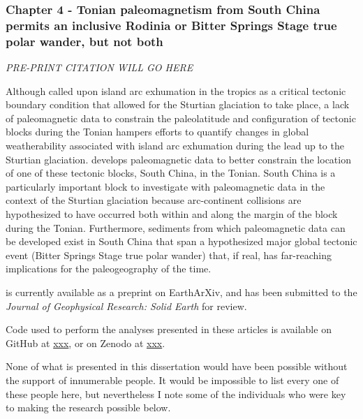 \documentclass{ucbthesis}
\begin{document}
\begin{frontmatter}
\begin{preface}
\subsubsection*{Chapter 4 - Tonian paleomagnetism from South China permits an inclusive Rodinia or Bitter Springs Stage true polar wander, but not both}

\noindent
\textit{PRE-PRINT CITATION WILL GO HERE}

\bigskip

Although \citet{Park2020a} called upon island arc exhumation in the tropics as a critical tectonic boundary condition that allowed for the Sturtian glaciation to take place, a lack of paleomagnetic data to constrain the paleolatitude and configuration of tectonic blocks during the Tonian hampers efforts to quantify changes in global weatherability associated with island arc exhumation during the lead up to the Sturtian glaciation. \citet{Park2020c} develops paleomagnetic data to better constrain the location of one of these tectonic blocks, South China, in the Tonian. South China is a particularly important block to investigate with paleomagnetic data in the context of the Sturtian glaciation because arc-continent collisions are hypothesized to have occurred both within and along the margin of the block during the Tonian. Furthermore, sediments from which paleomagnetic data can be developed exist in South China that span a hypothesized major global tectonic event (Bitter Springs Stage true polar wander) that, if real, has far-reaching implications for the paleogeography of the time.

\citet{Park2020c} is currently available as a preprint on EarthArXiv, and has been submitted to the \textit{Journal of Geophysical Research: Solid Earth} for review.

Code used to perform the analyses presented in these articles is available on GitHub at \url{xxx}, or on Zenodo at \url{xxx}.

\end{preface}


\begin{acknowledgements}

None of what is presented in this dissertation would have been possible without the support of innumerable people. It would be impossible to list every one of these people here, but nevertheless I note some of the individuals who were key to making the research possible below.


\end{acknowledgements}
\end{frontmatter}
\end{document}
